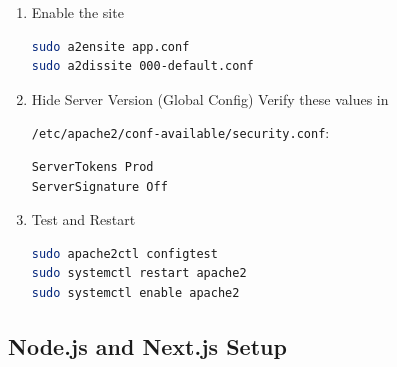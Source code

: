\documentclass[12pt,a4paper]{report}
\begin{document}
\begin{enumerate}
\begin{lstlisting}[language=bash]
    # Security headers (requires mod_headers)
    Header always set Strict-Transport-Security "max-age=63072000; includeSubDomains"
    Header always set X-Content-Type-Options "nosniff"
    Header always set X-Frame-Options "SAMEORIGIN"

    # Health check - served directly by Apache, bypasses Node.js
    ProxyPass /health !
    Alias /health /var/www/app/out/health.html

    # Static assets served directly by Apache (bypass Node.js)
    ProxyPass /_next/static/ !
    Alias /_next/static/ /var/www/app/out/_next/static/

    # Reverse proxy to Next.js
    ProxyPreserveHost On
    ProxyPass / http://127.0.0.1:3000/
    ProxyPassReverse / http://127.0.0.1:3000/

    # Logs
    ErrorLog ${APACHE_LOG_DIR}/app-error.log
    CustomLog ${APACHE_LOG_DIR}/app-access.log combined
</VirtualHost>
\end{lstlisting}
\begin{markdownnote}
The virtual host configuration (\texttt{/etc/apache2/sites-available/app.conf}) defines two blocks: an HTTP-to-HTTPS redirect on port 80, and a full reverse proxy on port 443 with TLS termination. Static assets (\texttt{\_next/static/}) and the health check endpoint are served directly by Apache, bypassing Node.js entirely:
\end{markdownnote}

\item Enable the site
\begin{lstlisting}[language=bash]
sudo a2ensite app.conf
sudo a2dissite 000-default.conf
\end{lstlisting}

\item Hide Server Version (Global Config)
Verify these values in 

\texttt{/etc/apache2/conf-available/security.conf}:
\begin{lstlisting}[language=bash]
ServerTokens Prod
ServerSignature Off
\end{lstlisting}

\item Test and Restart
\begin{lstlisting}[language=bash]
sudo apache2ctl configtest
sudo systemctl restart apache2
sudo systemctl enable apache2
\end{lstlisting}
\end{enumerate}

\subsection{Node.js and Next.js Setup}
\end{document}
